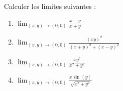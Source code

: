 

\begin{exercice}\label{exoFoncDeuxVar0010}

	Calculer les limites suivantes :
	\begin{enumerate}

		\item
			$\lim_{(x,y)\to(0,0)}\frac{ x-y }{ x+y }$
		\item
			$\lim_{(x,y)\to(0,0)}\frac{ (xy)^2 }{ (x+y)^2+(x-y)^2 }$
		\item
			$\lim_{(x,y)\to(0,0)}\frac{ xy^3 }{ x^2+y^2 }$
		\item
			$\lim_{(x,y)\to(0,0)}\frac{ x\sin(y) }{ \sqrt{x^2+y^2} }$

	\end{enumerate}

\end{exercice}
